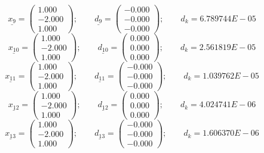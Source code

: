 \documentclass{report}[10pts]
\begin{document}
\[
      \underline{x_{9}}=
      \begin{pmatrix}
      1.000 \\ -2.000 \\ 1.000
      \end{pmatrix}
   ;\qquad
      \underline{d_{9}}=
      \begin{pmatrix}
      -0.000 \\ -0.000 \\ -0.000
      \end{pmatrix}
   ;\qquad
   d_k=6.789744E-05
\]
\[
      \underline{x_{10}}=
      \begin{pmatrix}
      1.000 \\ -2.000 \\ 1.000
      \end{pmatrix}
   ;\qquad
      \underline{d_{10}}=
      \begin{pmatrix}
      0.000 \\ 0.000 \\ 0.000
      \end{pmatrix}
   ;\qquad
   d_k=2.561819E-05
\]
\[
      \underline{x_{11}}=
      \begin{pmatrix}
      1.000 \\ -2.000 \\ 1.000
      \end{pmatrix}
   ;\qquad
      \underline{d_{11}}=
      \begin{pmatrix}
      -0.000 \\ -0.000 \\ -0.000
      \end{pmatrix}
   ;\qquad
   d_k=1.039762E-05
\]
\[
      \underline{x_{12}}=
      \begin{pmatrix}
      1.000 \\ -2.000 \\ 1.000
      \end{pmatrix}
   ;\qquad
      \underline{d_{12}}=
      \begin{pmatrix}
      0.000 \\ 0.000 \\ 0.000
      \end{pmatrix}
   ;\qquad
   d_k=4.024741E-06
\]
\[
      \underline{x_{13}}=
      \begin{pmatrix}
      1.000 \\ -2.000 \\ 1.000
      \end{pmatrix}
   ;\qquad
      \underline{d_{13}}=
      \begin{pmatrix}
      -0.000 \\ -0.000 \\ -0.000
      \end{pmatrix}
   ;\qquad
   d_k=1.606370E-06
\]
\end{document}
